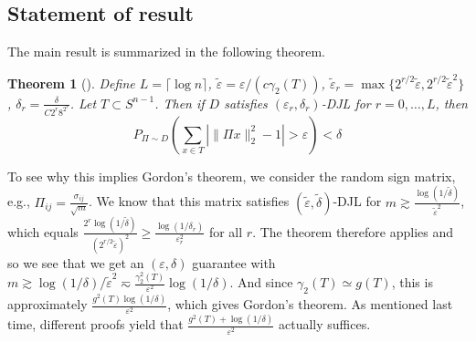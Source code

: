 \documentclass[11pt]{article}
\newtheorem{theorem}{Theorem}
\newcommand{\ep}{\varepsilon}
\begin{document}
\subsection{Statement of result}
The main result is summarized in the following theorem.
\begin{theorem}[\cite{Recht}] \label{thm:ORS}
Define $L = \lceil \log n \rceil$, $\tilde \ep = \ep / (c \gamma_2(T))$, $\tilde \ep_r = \max \{2^{r/2} \tilde \ep, 2^{r/2} \tilde \ep^2 \}$, $\delta_r = \frac{\delta}{C 2^r 8^{2^r}}$. Let $T \subset S^{n-1}$. Then if $D$ satisfies $(\ep_r, \delta_r)$-DJL for $r = 0, \ldots, L$, then
\[
P_{\Pi \sim D} \left( \sum_{x \in T} \left| \| \Pi x\|_2^2 - 1 \right| > \ep \right) < \delta
\]
\end{theorem}
To see why this implies Gordon's theorem, we consider the random sign matrix, e.g., $\Pi_{ij} = \frac{\sigma_{ij}}{\sqrt{m}}$. We know that this matrix satisfies $(\tilde \ep, \tilde \delta)$-DJL for $m \gtrsim \frac{\log(1/\tilde \delta)}{\tilde \ep^2}$, which equals $\frac{2^r \log(1/\tilde \delta)}{(2^{r/2} \tilde\ep)^2} \geq \frac{\log(1/\delta_r)}{\ep_r^2}$ for all $r$. The theorem therefore applies and so we see that we get an $(\ep, \delta)$ guarantee with $m \gtrsim \log(1/\delta) / \tilde \ep^2 \eqsim \frac{\gamma_2^2(T)}{\ep^2}\log(1/\delta)$. And since $\gamma_2(T) \simeq g(T)$, this is approximately $\frac{g^2(T) \log(1/\delta)}{\ep^2}$, which gives Gordon's theorem. As mentioned last time, different proofs yield that $\frac{g^2(T) + \log(1/\delta)}{\ep^2}$ actually suffices.
\end{document}
